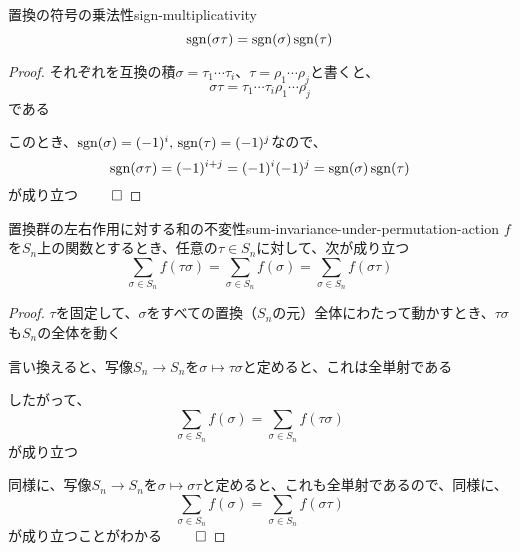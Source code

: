 \documentclass[../../../topic_linear-algebra]{subfiles}
\begin{document}
\sectionline

\begin{theorem}{置換の符号の乗法性}{sign-multiplicativity}
  \begin{equation*}
    \operatorname{sgn}(\sigma \tau) = \operatorname{sgn}(\sigma) \operatorname{sgn}(\tau)
  \end{equation*}
\end{theorem}

\begin{proof}
  それぞれを互換の積$\sigma = \tau_1 \cdots \tau_i$、$\tau = \rho_1 \cdots \rho_j$と書くと、
  \begin{equation*}
    \sigma \tau = \tau_1 \cdots \tau_i \rho_1 \cdots \rho_j
  \end{equation*}
  である

  このとき、$\operatorname{sgn}(\sigma) = (-1)^i, \, \operatorname{sgn}(\tau) = (-1)^j$なので、
  \begin{equation*}
    \operatorname{sgn}(\sigma \tau) = (-1)^{i+j} = (-1)^i (-1)^j = \operatorname{sgn}(\sigma) \operatorname{sgn}(\tau)
  \end{equation*}
  が成り立つ $\qed$
\end{proof}

\sectionline

\begin{theorem}{置換群の左右作用に対する和の不変性}{sum-invariance-under-permutation-action}
  $f$を$S_n$上の関数とするとき、任意の$\tau \in S_n$に対して、次が成り立つ
  \begin{equation*}
    \sum_{\sigma \in S_n} f(\tau\sigma) = \sum_{\sigma \in S_n} f(\sigma) = \sum_{\sigma \in S_n} f(\sigma\tau)
  \end{equation*}
\end{theorem}

\begin{proof}
  $\tau$を固定して、$\sigma$をすべての置換（$S_n$の元）全体にわたって動かすとき、$\tau\sigma$も$S_n$の全体を動く

  言い換えると、写像$S_n \to S_n$を$\sigma \longmapsto \tau\sigma$と定めると、これは全単射である

  したがって、
  \begin{equation*}
    \sum_{\sigma \in S_n} f(\sigma) = \sum_{\sigma \in S_n} f(\tau\sigma)
  \end{equation*}
  が成り立つ

  \br

  同様に、写像$S_n \to S_n$を$\sigma \longmapsto \sigma\tau$と定めると、これも全単射であるので、同様に、
  \begin{equation*}
    \sum_{\sigma \in S_n} f(\sigma) = \sum_{\sigma \in S_n} f(\sigma\tau)
  \end{equation*}
  が成り立つことがわかる $\qed$
\end{proof}
\end{document}
